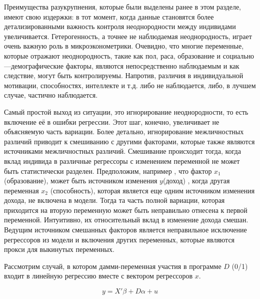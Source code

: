 	
	Преимущества разукрупнения, которые были выделены ранее в этом разделе, имеют свою издержки: в тот момент, когда данные становятся более детализированными важность контроля неоднородности между индивидами увеличивается. Гетерогенность, а точнее не наблюдаемая неоднородность, играет очень важную роль в микроэконометрики. Очевидно, что многие переменные, которые отражают неоднородность, такие как пол, раса, образование и социально---демографические факторы, являются непосредственно наблюдаемым и как следствие, могут быть контролируемы. Напротив, различия в индивидуальной мотивации, способностях, интеллекте и т.д. либо не наблюдается, либо, в лучшем случае, частично наблюдается.
	
	
	Самый простой выход из ситуации, это игнорирование неоднородности, то есть включение её в ошибки регрессии. Этот шаг, конечно, увеличивает не объясняемую часть вариации. Более детально, игнорирование межличностных различий приводит к смешиванию с другими факторами, которые также являются источниками межличностных различий. Смешивание происходит тогда, когда вклад индивида в различные регрессоры с изменением переменной не может быть статистически разделен. Предположим, например , что фактор $x_{1}$ (образование), может быть источником изменения $y$(доход) , когда другая переменная $x_{2}$ (способность), которая является еще одним источником изменения дохода, не включена в модели. Тогда та часть полной вариации, которая приходится на вторую переменную может быть неправильно отнесена к первой переменной. Интуитивно, их относительный вклад в изменение дохода смешан. Ведущим источником смешанных факторов является неправильное исключение регрессоров из модели и включения других переменных, которые являются прокси для выкинутых переменных.
	
Рассмотрим случай, в котором дамми-переменная участия в программе $D$ (0/1) входит в линейную регрессию вместе с вектором регрессоров $x$.
	
\begin{equation}
y=X'\beta+D\alpha+u
\end{equation}


